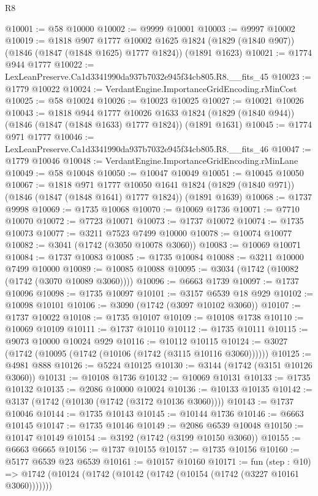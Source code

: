 \begin{lexlean}{R8}
\begin{coremodule}
@10001 := @58 @10000
@10002 := @9999 @10001
@10003 := @9997 @10002
@10019 := @1818
    @907
    @1777
    @10002
    @1625
    @1824
    (@1829 (@1840 @907))
    (@1846 (@1847 (@1848 @1625) @1777 @1824))
    (@1891 @1623)
@10021 := @1774 @944 @1777
@10022 := LexLeanPreserve.Ca1d3341990da937b7032e945f34cb805.R8.__fits_45
@10023 := @1779 @10022
@10024 := VerdantEngine.ImportanceGridEncoding.rMinCost
@10025 := @58 @10024
@10026 := @10023 @10025
@10027 := @10021 @10026
@10043 := @1818
    @944
    @1777
    @10026
    @1633
    @1824
    (@1829 (@1840 @944))
    (@1846 (@1847 (@1848 @1633) @1777 @1824))
    (@1891 @1631)
@10045 := @1774 @971 @1777
@10046 := LexLeanPreserve.Ca1d3341990da937b7032e945f34cb805.R8.__fits_46
@10047 := @1779 @10046
@10048 := VerdantEngine.ImportanceGridEncoding.rMinLane
@10049 := @58 @10048
@10050 := @10047 @10049
@10051 := @10045 @10050
@10067 := @1818
    @971
    @1777
    @10050
    @1641
    @1824
    (@1829 (@1840 @971))
    (@1846 (@1847 (@1848 @1641) @1777 @1824))
    (@1891 @1639)
@10068 := @1737 @9998
@10069 := @1735 @10068
@10070 := @10069 @1736
@10071 := @7710 @10070
@10072 := @7723 @10071
@10073 := @1737 @10072
@10074 := @1735 @10073
@10077 := @3211 @7523 @7499 @10000
@10078 := @10074 @10077
@10082 := @3041 (@1742 (@3050 @10078 @3060))
@10083 := @10069 @10071
@10084 := @1737 @10083
@10085 := @1735 @10084
@10088 := @3211 @10000 @7499 @10000
@10089 := @10085 @10088
@10095 := @3034 (@1742 (@10082 (@1742 (@3070 @10089 @3060))))
@10096 := @6663 @1739
@10097 := @1737 @10096
@10098 := @1735 @10097
@10101 := @3157 @6539 @18 @929
@10102 := @10098 @10101
@10106 := @3090 (@1742 (@3097 @10102 @3060))
@10107 := @1737 @10022
@10108 := @1735 @10107
@10109 := @10108 @1738
@10110 := @10069 @10109
@10111 := @1737 @10110
@10112 := @1735 @10111
@10115 := @9073 @10000 @10024 @929
@10116 := @10112 @10115
@10124 := @3027 (@1742 (@10095 (@1742 (@10106 (@1742 (@3115 @10116 @3060))))))
@10125 := @4981 @888
@10126 := @5224 @10125
@10130 := @3144 (@1742 (@3151 @10126 @3060))
@10131 := @10108 @1736
@10132 := @10069 @10131
@10133 := @1735 @10132
@10135 := @2086 @10000 @10024
@10136 := @10133 @10135
@10142 := @3137 (@1742 (@10130 (@1742 (@3172 @10136 @3060))))
@10143 := @1737 @10046
@10144 := @1735 @10143
@10145 := @10144 @1736
@10146 := @6663 @10145
@10147 := @1735 @10146
@10149 := @2086 @6539 @10048
@10150 := @10147 @10149
@10154 := @3192 (@1742 (@3199 @10150 @3060))
@10155 := @6663 @6665
@10156 := @1737 @10155
@10157 := @1735 @10156
@10160 := @5177 @6539 @23 @6539
@10161 := @10157 @10160
@10171 := fun (step : @10) =>
  @1742 (@10124 (@1742 (@10142 (@1742 (@10154 (@1742 (@3227 @10161 @3060)))))))

\end{coremodule}
\end{lexlean}
